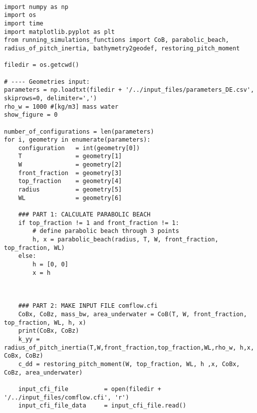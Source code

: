 \begin{mdframed}[backgroundcolor=light-gray, roundcorner=10pt,leftmargin=1, rightmargin=1, innerleftmargin=0, innertopmargin=7,innerbottommargin=0, outerlinewidth=1, linecolor=light-gray]
\begin{lstlisting}[linewidth=\columnwidth,caption= Script for creating comflow.cfi and  breakwater.in files ., label=script: creating comflow.cfi and breakwater.in]

import numpy as np
import os
import time
import matplotlib.pyplot as plt
from running_simulations_functions import CoB, parabolic_beach, radius_of_pitch_inertia, bathymetry2geodef, restoring_pitch_moment

filedir = os.getcwd()

# ---- Geometries input:
parameters = np.loadtxt(filedir + '/../input_files/parameters_DE.csv', skiprows=0, delimiter=',')
rho_w = 1000 #[kg/m3] mass water
show_figure = 0

number_of_configurations = len(parameters)
for i, geometry in enumerate(parameters):
    configuration   = int(geometry[0])
    T               = geometry[1]
    W               = geometry[2]
    front_fraction  = geometry[3]
    top_fraction    = geometry[4]
    radius          = geometry[5]
    WL              = geometry[6]

    ### PART 1: CALCULATE PARABOLIC BEACH
    if top_fraction != 1 and front_fraction != 1:
        # define parabolic beach through 3 points
        h, x = parabolic_beach(radius, T, W, front_fraction, top_fraction, WL)
    else:
        h = [0, 0]
        x = h



    ### PART 2: MAKE INPUT FILE comflow.cfi
    CoBx, CoBz, mass_bw, area_underwater = CoB(T, W, front_fraction, top_fraction, WL, h, x)
    print(CoBx, CoBz)
    k_yy = radius_of_pitch_inertia(T,W,front_fraction,top_fraction,WL,rho_w, h,x, CoBx, CoBz)
    c_dd = restoring_pitch_moment(W, top_fraction, WL, h ,x, CoBx, CoBz, area_underwater)

    input_cfi_file          = open(filedir + '/../input_files/comflow.cfi', 'r')
    input_cfi_file_data     = input_cfi_file.read()


\end{lstlisting}
\end{mdframed}
